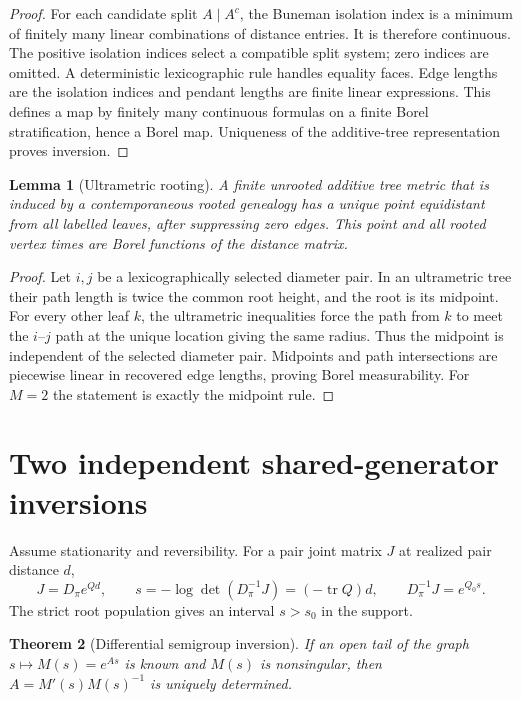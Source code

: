 \documentclass[11pt]{article}
\newtheorem{theorem}{Theorem}[section]
\newtheorem{lemma}[theorem]{Lemma}
\newcommand{\tr}{\operatorname{tr}}
\begin{document}
\begin{proof}
For each candidate split $A\mid A^c$, the Buneman isolation index is a minimum of finitely many linear combinations of distance entries.  It is therefore continuous.  The positive isolation indices select a compatible split system; zero indices are omitted.  A deterministic lexicographic rule handles equality faces.  Edge lengths are the isolation indices and pendant lengths are finite linear expressions.  This defines a map by finitely many continuous formulas on a finite Borel stratification, hence a Borel map.  Uniqueness of the additive-tree representation proves inversion.
\end{proof}

\begin{lemma}[Ultrametric rooting]
\label{lem:rooting}
A finite unrooted additive tree metric that is induced by a contemporaneous rooted genealogy has a unique point equidistant from all labelled leaves, after suppressing zero edges.  This point and all rooted vertex times are Borel functions of the distance matrix.
\end{lemma}

\begin{proof}
Let $i,j$ be a lexicographically selected diameter pair.  In an ultrametric tree their path length is twice the common root height, and the root is its midpoint.  For every other leaf $k$, the ultrametric inequalities force the path from $k$ to meet the $i$--$j$ path at the unique location giving the same radius.  Thus the midpoint is independent of the selected diameter pair.  Midpoints and path intersections are piecewise linear in recovered edge lengths, proving Borel measurability.  For $M=2$ the statement is exactly the midpoint rule.
\end{proof}

\section{Two independent shared-generator inversions}

Assume stationarity and reversibility.  For a pair joint matrix $J$ at realized pair distance $d$,
\[
J=D_\pi e^{Qd},\qquad
s=-\log\det(D_\pi^{-1}J)=(-\tr Q)d,
\qquad
D_\pi^{-1}J=e^{Q_0s}.
\]
The strict root population gives an interval $s>s_0$ in the support.

\begin{theorem}[Differential semigroup inversion]
If an open tail of the graph $s\mapsto M(s)=e^{As}$ is known and $M(s)$ is nonsingular, then $A=M'(s)M(s)^{-1}$ is uniquely determined.
\end{theorem}
\end{document}
